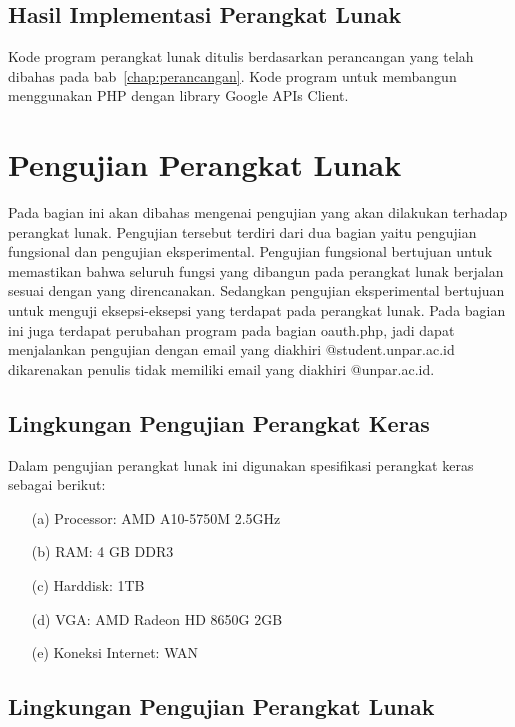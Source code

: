\subsection{Hasil Implementasi Perangkat Lunak}
\label{sec:hasilimplementasi}

Kode program perangkat lunak ditulis berdasarkan perancangan yang telah dibahas
pada bab~\ref{chap:perancangan}. Kode program untuk membangun  menggunakan PHP
dengan library Google APIs Client.

\section{Pengujian Perangkat Lunak}
\label{sec:pengujianperangkatlunak}

Pada bagian ini akan dibahas mengenai pengujian yang akan dilakukan terhadap
perangkat lunak. Pengujian tersebut terdiri dari dua bagian yaitu pengujian
fungsional dan pengujian eksperimental. Pengujian fungsional bertujuan untuk
memastikan bahwa seluruh fungsi yang dibangun pada perangkat lunak berjalan
sesuai dengan yang direncanakan. Sedangkan pengujian eksperimental bertujuan
untuk menguji eksepsi-eksepsi yang terdapat pada perangkat lunak. Pada bagian
ini juga terdapat perubahan program pada bagian oauth.php, jadi dapat
menjalankan pengujian dengan email yang diakhiri @student.unpar.ac.id
dikarenakan penulis tidak memiliki email yang diakhiri @unpar.ac.id.

\subsection{Lingkungan Pengujian Perangkat Keras}
\label{sec:lingkunganpengujianperangkatkeras}

Dalam pengujian perangkat lunak ini digunakan spesifikasi perangkat keras sebagai berikut:

\begin{enumerate}
\item[(a)] Processor: AMD A10-5750M 2.5GHz
\item[(b)] RAM: 4 GB DDR3
\item[(c)] Harddisk: 1TB
\item[(d)] VGA: AMD Radeon HD 8650G 2GB
\item[(e)] Koneksi Internet: WAN
\end{enumerate}

\subsection{Lingkungan Pengujian Perangkat Lunak}
\label{sec:lingkunganpengujianperangkatlunak}


